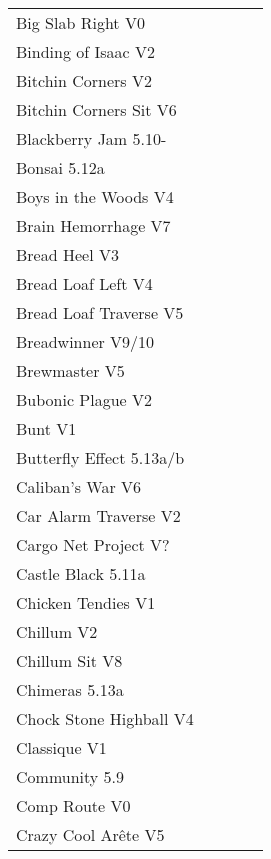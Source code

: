 \begin{flushleft}
\begin{center}
\begin{supertabular}{p{0.76\linewidth}p{0.08\linewidth}}
Big Slab Right V0 & \pageref{rt:Big Slab Right} \\
Binding of Isaac V2 & \pageref{rt:Binding of Isaac} \\
Bitchin Corners V2 & \pageref{rt:Bitchin Corners} \\
Bitchin Corners Sit V6 & \pageref{vr:Bitchin Corners Sit} \\
Blackberry Jam 5.10- & \pageref{rt:Blackberry Jam} \\
Bonsai 5.12a & \pageref{rt:Bonsai} \\
Boys in the Woods V4 & \pageref{rt:Boys in the Woods} \\
Brain Hemorrhage V7 & \pageref{vr:Brain Hemorrhage} \\
Bread Heel V3 & \pageref{rt:Bread Heel} \\
Bread Loaf Left V4 & \pageref{rt:Bread Loaf Left} \\
Bread Loaf Traverse V5 & \pageref{rt:Bread Loaf Traverse} \\
Breadwinner V9/10 & \pageref{rt:Breadwinner} \\
Brewmaster V5 & \pageref{rt:Brewmaster} \\
Bubonic Plague V2 & \pageref{rt:Bubonic Plague} \\
Bunt V1 & \pageref{rt:Bunt} \\
Butterfly Effect 5.13a/b & \pageref{rt:Butterfly Effect} \\
Caliban's War V6 & \pageref{rt:Caliban's War} \\
Car Alarm Traverse V2 & \pageref{rt:Car Alarm Traverse} \\
Cargo Net Project V? & \pageref{rt:Cargo Net Project} \\
Castle Black 5.11a & \pageref{rt:Castle Black} \\
Chicken Tendies V1 & \pageref{rt:Chicken Tendies} \\
Chillum V2 & \pageref{rt:Chillum} \\
Chillum Sit V8 & \pageref{vr:Chillum Sit} \\
Chimeras 5.13a & \pageref{rt:Chimeras} \\
Chock Stone Highball V4 & \pageref{rt:Chock Stone Highball} \\
Classique V1 & \pageref{rt:Classique} \\
Community 5.9 & \pageref{rt:Community} \\
Comp Route V0 & \pageref{rt:Comp Route} \\
Crazy Cool Arête V5 & \pageref{rt:Crazy Cool Arête} \\

\end{supertabular}
\end{center}
\end{flushleft}
